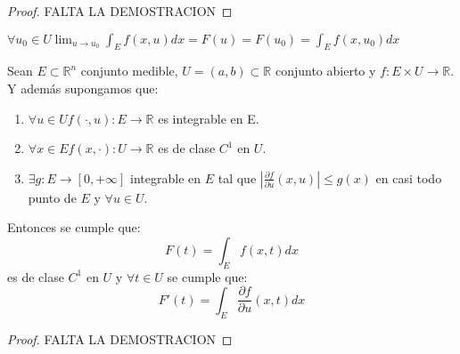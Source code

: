 \begin{proof}
    FALTA LA DEMOSTRACION
\end{proof}
\begin{observación}
    $\forall u_0 \in U \lim_{u \to u_0} \int_{E}f(x, u)dx = F(u) = F(u_0) = \int_{E}f(x, u_0)dx$
\end{observación}
\begin{teorema}
    Sean $E \subset \mathbb{R}^n$ conjunto medible, $U = (a, b) \subset \mathbb{R}$ conjunto abierto y $f: E \times U \to \mathbb{R}$. Y además supongamos que: 
    \begin{enumerate}
        \item $\forall u \in U f(\cdot, u): E \to \mathbb{R}$ es integrable en E.
        \item $\forall x \in E f(x, \cdot): U \to \mathbb{R}$ es de clase $C^1$ en $U$.
        \item $\exists g: E \to [0, +\infty]$ integrable en $E$ tal que $|\frac{\partial f}{\partial u}(x, u)| \leq g(x)$ en casi todo punto de $E$ y $\forall u \in U$.
    \end{enumerate}
    Entonces se cumple que: 
    $$ F(t) = \int_{E}f(x,t)dx $$ es de clase $C^1$ en $U$ y $\forall t \in U$ se cumple que: $$ F'(t) = \int_{E}\frac{\partial f}{\partial u}(x, t)dx $$
\end{teorema}
\begin{proof}
    FALTA LA DEMOSTRACION
\end{proof}